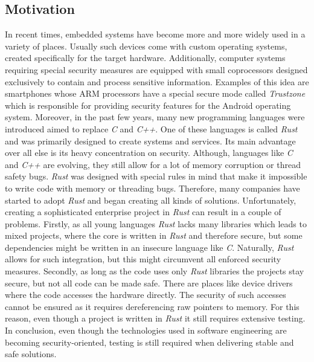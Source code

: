 \subsection{Motivation}
In recent times, embedded systems have become more and more widely used in a variety of places. Usually such devices come with custom operating systems, created specifically for the target hardware. Additionally, computer systems requiring special security measures are equipped with small coprocessors designed exclusively to contain and process sensitive information. Examples of this idea are smartphones whose ARM processors have a special secure mode called \textit{Trustzone} which is responsible for providing security features for the Android operating system. Moreover, in the past few years, many new programming languages were introduced aimed to replace \textit{C} and \textit{C++}. One of these languages is called \textit{Rust} and was primarily designed to create systems and services. Its main advantage over all else is its heavy concentration on security. Although, languages like \textit{C} and \textit{C++} are evolving, they still allow for a lot of memory corruption or thread safety bugs. \textit{Rust} was designed with special rules in mind that make it impossible to write code with memory or threading bugs. Therefore, many companies have started to adopt \textit{Rust} and began creating all kinds of solutions. Unfortunately, creating a sophisticated enterprise project in \textit{Rust} can result in a couple of problems. Firstly, as all young languages \textit{Rust} lacks many libraries which leads to mixed projects, where the core is written in \textit{Rust} and therefore secure, but some dependencies might be written in an insecure language like \textit{C}. Naturally, \textit{Rust} allows for such integration, but this might circumvent all enforced security measures. Secondly, as long as the code uses only \textit{Rust} libraries the projects stay secure, but not all code can be made safe. There are places like device drivers where the code accesses the hardware directly. The security of such accesses cannot be ensured as it requires dereferencing raw pointers to memory. For this reason, even though a project is written in \textit{Rust} it still requires extensive testing. In conclusion, even though the technologies used in software engineering are becoming security-oriented, testing is still required when delivering stable and safe solutions.

